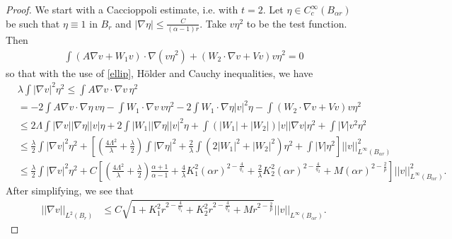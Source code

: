 \documentclass[12pt,reqno]{amsart}
\theoremstyle{plain}
\theoremstyle{definition}
\newcommand{\al}{\alpha}
\newcommand{\la}{\lambda}
\newcommand{\La}{\Lambda}
\newcommand{\iny}{\infty}
\newcommand{\gr}{\nabla}
\newcommand{\norm}[1]{\left\vert \left\vert #1\right\vert\right\vert}
\newcommand{\abs}[1]{\left\vert#1\right\vert}
\newcommand{\brac}[1]{\left[#1\right]}
\newcommand{\pr}[1]{\left( #1 \right) }
\begin{document}
\begin{proof}
We start with a Caccioppoli estimate, i.e. with $t = 2$.
Let $\eta \in C^\iny_c\pr{B_{\al r}}$ be such that $\eta \equiv 1$ in $B_r$ and $\abs{\gr \eta} \le \frac C {\pr{\al -1} r}$.
Take $v \eta^2$ to be the test function. 
Then
\begin{align*}
\int \pr{A \gr v  + W_1 v }\cdot \gr\pr{v \eta^2}  + \pr{W_2 \cdot \gr v +V v} v \eta^2 = 0
\end{align*}
so that with the use of \eqref{ellip}, H\"older and Cauchy inequalities, we have
\begin{align*}
&\la \int \abs{\gr v}^2 \eta^2
\le \int A \gr v \cdot \gr v \, \eta^2 \\
&= - 2 \int A \gr v \cdot \gr \eta \, v \eta 
- \int W_1 \cdot \gr v \, v \eta^2
- 2 \int W_1 \cdot \gr \eta \abs{v}^2 \eta
- \int \pr{W_2 \cdot \gr v +V v} v \eta^2  \\
&\le 2 \La \int \abs{\gr v} \abs{\gr \eta} \abs{v} \eta 
+ 2 \int \abs{W_1} \abs{\gr \eta} \abs{v}^2 \eta
+ \int \pr{\abs{W_1} + \abs{W_2}} \abs{v} \abs{\gr v} \eta^2 
+ \int \abs{V} v^2 \eta^2 \\
&\le \frac{\la}{2} \int \abs{\gr v}^2 \eta^2 
+ \brac{\pr{\frac{4 \La^2}{\la} + \frac \la 2} \int \abs{\gr \eta}^2 
+ \frac{2}{\la} \int \pr{2\abs{W_1}^2 + \abs{W_2}^2} \eta^2 
+ \int \abs{V} \eta^2}  \norm{v}_{L^\iny\pr{B_{\al r}}}^2 \\
&\le \frac{\la}{2} \int \abs{\gr v}^2 \eta^2 
+ C \brac{\pr{\frac{4 \La^2}{\la} + \frac \la 2} \frac{\al +1}{\al -1}+ \frac{4}{\la} K_1^2 \pr{ \al r}^{2 - \frac 4 {q_1}} + \frac{2}{\la} K_2^2 \pr{ \al r}^{2 - \frac 4 {q_2}}  + M \pr{\al r}^{2 - \frac 2 p} }  \norm{v}_{L^\iny\pr{B_{\al r}}}^2.
\end{align*}
After simplifying, we see that
\begin{align*}
\norm{\gr v}_{L^2\pr{B_{r}}}
&\le C \sqrt{1 + K_1^2 r^{2 - \frac 4 {q_1}} + K_2^2 r^{2 - \frac 4 {q_2}}  + M r^{2 - \frac 2 p} }  \norm{v}_{L^\iny\pr{B_{\al r}}}.
\end{align*}


\end{proof}
\end{document}
